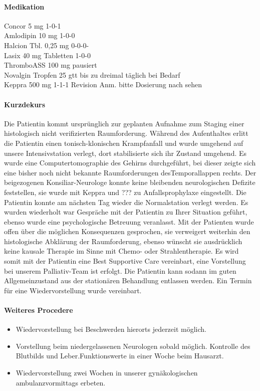 \documentclass[
ngerman,
paper=a4,
asymmetric,
fontsize=10pt,
draft=false,
numbers=noenddot,
bibtotocnumbered,
footnotes=multiple,
]{scrreprt}
\begin{document}
\paragraph{Medikation} 
Concor
5 mg 1-0-1 \\
Amlodipin 10 mg 1-0-0 \\
Halcion Tbl. 0,25 mg 
0-0-0-\\ 
Lasix 40 mg Tabletten 1-0-0
\\
ThromboASS 100 mg pausiert 
\\
Novalgin Tropfen 25 gtt bis zu
dreimal täglich bei Bedarf 
\\
Keppra 500 mg 1-1-1 Revision Anm.
bitte Dosierung nach sehen

\paragraph{Kurzdekurs} Die Patientin kommt ursprünglich zur geplanten
Aufnahme zum Staging einer histologisch nicht
verifizierten Raumforderung. Während des Aufenthaltes
erlitt die Patientin einen tonisch-klonischen Krampfanfall und
wurde umgehend auf unsere Intensivstation verlegt, dort
stabilisierte sich ihr Zustand umgehend. Es wurde
eine Computertomographie des Gehirns durchgeführt, bei
dieser zeigte sich eine bisher noch nicht bekannte
Raumforderungen desTemporallappen rechts. Der
beigezogenen Konsiliar-Neurologe konnte keine bleibenden
neurologischen Defizite feststellen, sie wurde mit
Keppra und ??? zu Anfallsprophylaxe eingestellt. Die Patientin
konnte am nächsten Tag wieder die Normalstation verlegt
werden. Es wurden wiederholt war Gespräche mit der Patientin
zu Ihrer Situation geführt, ebenso wurde eine psychologische
Betreuung veranlasst. Mit der Patienten wurde offen über die
 möglichen Konsequenzen gesprochen,  sie
verweigert weiterhin den histologische Abklärung der
Raumforderung, ebenso wünscht sie ausdrücklich keine kausale Therapie im
Sinne mit Chemo- oder Strahlentherapie. Es wird somit mit der
Patientin eine Best Supportive Care vereinbart, eine
Vorstellung bei unserem Palliativ-Team ist erfolgt. Die
Patientin kann sodann im guten Allgemeinzustand aus der
stationären Behandlung entlassen werden. Ein Termin für eine
Wiedervorstellung wurde vereinbart. 

\paragraph{Weiteres Procedere} 
\begin{itemize}
  \item Wiedervorstellung bei Beschwerden hierorts jederzeit möglich.
  \item 
Vorstellung beim niedergelassenen Neurologen sobald möglich.
Kontrolle des Blutbilds und Leber.Funktionswerte in
einer Woche beim Hausarzt.
\item Wiedervorstellung zwei Wochen in unserer gynäkologischen
ambulanzvormittags erbeten.
\end{itemize}
\end{document}
